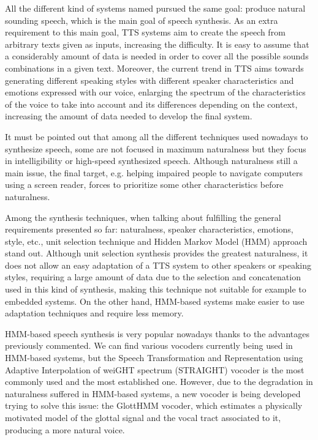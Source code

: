 All the different kind of systems named pursued the same goal: produce natural sounding speech, which is the main goal of speech synthesis. As an extra requirement to this main goal, TTS systems aim to create the speech from arbitrary texts given as inputs, increasing the difficulty. It is easy to assume that a considerably amount of data is needed in order to cover all the possible sounds combinations in a given text. Moreover, the current trend in TTS aims towards generating different speaking styles with different speaker characteristics and emotions expressed with our voice, enlarging the spectrum of the characteristics of the voice to take into account and its differences depending on the context, increasing the amount of data needed to develop the final system. 

It must be pointed out that among all the different techniques used nowadays to synthesize speech, some are not focused in maximum naturalness but they focus in intelligibility or high-speed synthesized speech. Although naturalness still a main issue, the final target, e.g. helping impaired people to navigate computers using a screen reader, forces to prioritize some other characteristics before naturalness. 

Among the synthesis techniques, when talking about fulfilling the general requirements presented so far: naturalness, speaker characteristics, emotions, style, etc., unit selection technique and Hidden Markov Model (HMM) approach stand out. Although unit selection synthesis provides the greatest naturalness, it does not allow an easy adaptation of a TTS system to other speakers or speaking styles, requiring a large amount of data due to the selection and concatenation used in this kind of synthesis, making this technique not suitable for example to embedded systems. On the other hand, HMM-based systems make easier to use adaptation techniques and require less memory.

HMM-based speech synthesis is very popular nowadays thanks to the advantages previously commented. We can find various vocoders currently being used in HMM-based systems, but the Speech Transformation and Representation using Adaptive Interpolation of weiGHT spectrum (STRAIGHT) vocoder is the most commonly used and the most established one. However, due to the degradation in naturalness suffered in HMM-based systems, a new vocoder is being developed trying to solve this issue: the GlottHMM vocoder, which estimates a physically motivated model of the glottal signal and the vocal tract associated to it, producing a more natural voice. 

